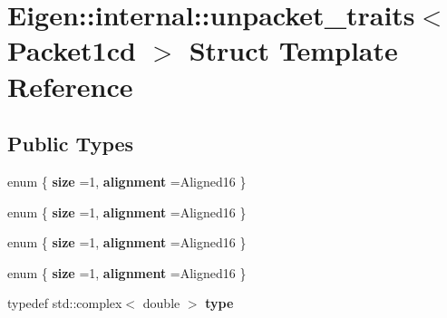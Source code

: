 \hypertarget{struct_eigen_1_1internal_1_1unpacket__traits_3_01_packet1cd_01_4}{}\section{Eigen\+:\+:internal\+:\+:unpacket\+\_\+traits$<$ Packet1cd $>$ Struct Template Reference}
\label{struct_eigen_1_1internal_1_1unpacket__traits_3_01_packet1cd_01_4}
\subsection*{Public Types}
\begin{DoxyCompactItemize}
\item 
\mbox{\label{struct_eigen_1_1internal_1_1unpacket__traits_3_01_packet1cd_01_4_a24372bb8735256a92efed662b58b53f5}} 
enum \{ {\bfseries size} =1, 
{\bfseries alignment} =Aligned16
 \}
\item 
\mbox{\label{struct_eigen_1_1internal_1_1unpacket__traits_3_01_packet1cd_01_4_a54fd14ab3e30a7cfff08696f5c0d1703}} 
enum \{ {\bfseries size} =1, 
{\bfseries alignment} =Aligned16
 \}
\item 
\mbox{\label{struct_eigen_1_1internal_1_1unpacket__traits_3_01_packet1cd_01_4_a137fb76097622e94e116fefa6899e107}} 
enum \{ {\bfseries size} =1, 
{\bfseries alignment} =Aligned16
 \}
\item 
\mbox{\label{struct_eigen_1_1internal_1_1unpacket__traits_3_01_packet1cd_01_4_ab3ea77003fe151aa01d835cba64b3375}} 
enum \{ {\bfseries size} =1, 
{\bfseries alignment} =Aligned16
 \}
\item 
\mbox{\label{struct_eigen_1_1internal_1_1unpacket__traits_3_01_packet1cd_01_4_a4e58df3fde2b90a2ecbfdce3fa5256be}} 
typedef std\+::complex$<$ double $>$ {\bfseries type}
\item 
\mbox{\label{struct_eigen_1_1internal_1_1unpacket__traits_3_01_packet1cd_01_4_a2ef255344983f1a9c41803df2024f0af}} 

\end{DoxyCompactItemize}
